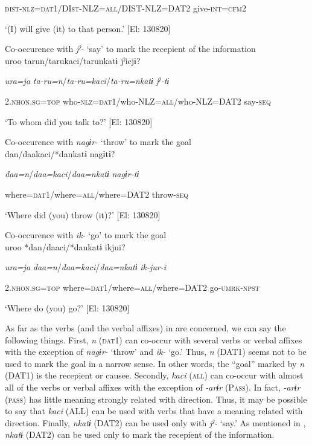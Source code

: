     \textsc{dist}-\textsc{nlz}=\textsc{dat}1/DI\textsc{st}-NLZ=\textsc{all}/DIST-NLZ=DAT2  give-\textsc{int}=\textsc{cfm}2

\glt    ‘(I) will give (it) to that person.’ [El: 130820]

\ex Co-occurence with \textit{jˀ-} ‘say’ to mark the recepient of the information\\

{\TM}
\gll uroo  tarun/tarukaci/tarunkatɨ  jˀicjɨ?

    \textit{ura=ja}  \textit{ta-ru=n}/\textit{ta-ru=kaci}/\textit{ta-ru=nkatɨ}  \textit{jˀ-tɨ}

    2.\textsc{nhon}.\textsc{sg}=\textsc{top}  who-\textsc{nlz}=\textsc{dat}1/who-NLZ=\textsc{all}/who-NLZ=DAT2  say-\textsc{seq}

\glt    ‘To whom did you talk to?’ [El: 130820]

\ex Co-occurence with \textit{nagɨr-} ‘throw’ to mark the goal\\

{\TM}
\gll *dan/daakaci/*dankatɨ  nagɨtɨ?

    \textit{daa=n}/\textit{daa=kaci}/\textit{daa=nkatɨ}  \textit{nagɨr-tɨ}

     where=\textsc{dat}1/where=\textsc{all}/where=DAT2  throw-\textsc{seq}

 \glt    ‘Where did (you) throw (it)?’ [El: 130820]

\ex Co-occurence with \textit{ik-} ‘go’ to mark the goal\\

{\TM}
\gll uroo  *dan/daaci/*dankatɨ  ikjui?

    \textit{ura=ja}  \textit{daa=n}/\textit{daa=kaci}/\textit{daa=nkatɨ}  \textit{ik-jur-i}

    2.\textsc{nhon}.\textsc{sg}=\textsc{top}  where=\textsc{dat}1/where=\textsc{all}/where=DAT2  go-\textsc{umrk}-\textsc{npst}

 \glt    ‘Where do (you) go?’ [El: 130820]

As far as the verbs (and the verbal affixes) in  are concerned, we can say the following things. First, \textit{n} (\textsc{dat}1) can co-occur with several verbs or verbal affixes with the exception of \textit{nagɨr-} ‘throw’ and \textit{ik-} ‘go.’ Thus, \textit{n} (DAT1) seems not to be used to mark the goal in a narrow sense. In other words, the “goal” marked by \textit{n} (DAT1) is the recepient or causee. Secondly, \textit{kaci} (\textsc{all}) can co-occur with almost all of the verbs or verbal affixes with the exception of \textit{{}-arɨr} (P\textsc{ass}). In fact, \textit{{}-arɨr} (\textsc{pass}) has little meaning strongly related with direction. Thus, it may be possible to say that \textit{kaci} (ALL) can be used with verbs that have a meaning related with direction. Finally, \textit{nkatɨ} (DAT2) can be used only with \textit{jˀ-} ‘say.’ As mentioned in , \textit{nkatɨ} (DAT2) can be used only to mark the recepient of the information.

